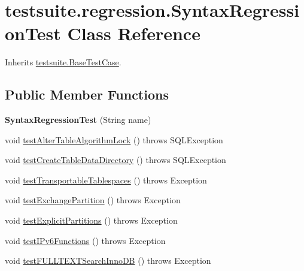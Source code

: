 \hypertarget{classtestsuite_1_1regression_1_1_syntax_regression_test}{}\section{testsuite.\+regression.\+Syntax\+Regression\+Test Class Reference}
\label{classtestsuite_1_1regression_1_1_syntax_regression_test}


Inherits \mbox{\hyperlink{classtestsuite_1_1_base_test_case}{testsuite.\+Base\+Test\+Case}}.

\subsection*{Public Member Functions}
\begin{DoxyCompactItemize}
\item 
\mbox{\label{classtestsuite_1_1regression_1_1_syntax_regression_test_a55470891999b68b586366e1eef322aab}} 
{\bfseries Syntax\+Regression\+Test} (String name)
\item 
void \mbox{\hyperlink{classtestsuite_1_1regression_1_1_syntax_regression_test_ad8db7c4293c435d564218db929d2d30d}{test\+Alter\+Table\+Algorithm\+Lock}} ()  throws S\+Q\+L\+Exception 
\item 
void \mbox{\hyperlink{classtestsuite_1_1regression_1_1_syntax_regression_test_a5e613256d2f2d7d6fbd6144c8b050670}{test\+Create\+Table\+Data\+Directory}} ()  throws S\+Q\+L\+Exception 
\item 
void \mbox{\hyperlink{classtestsuite_1_1regression_1_1_syntax_regression_test_a947576b5790653a73ac1cf0185c76fdd}{test\+Transportable\+Tablespaces}} ()  throws Exception 
\item 
void \mbox{\hyperlink{classtestsuite_1_1regression_1_1_syntax_regression_test_a27af4a565f65e6f33db3e05e87a2035a}{test\+Exchange\+Partition}} ()  throws Exception 
\item 
void \mbox{\hyperlink{classtestsuite_1_1regression_1_1_syntax_regression_test_a4aacde39fa83ec7ba0436c5eb372a98d}{test\+Explicit\+Partitions}} ()  throws Exception 
\item 
void \mbox{\hyperlink{classtestsuite_1_1regression_1_1_syntax_regression_test_af681c26981536cc82b5c316136ec34ea}{test\+I\+Pv6\+Functions}} ()  throws Exception 
\item 
void \mbox{\hyperlink{classtestsuite_1_1regression_1_1_syntax_regression_test_ab17b59b494fc9088d01ed9da04095161}{test\+F\+U\+L\+L\+T\+E\+X\+T\+Search\+Inno\+DB}} ()  throws Exception 

\end{DoxyCompactItemize}
